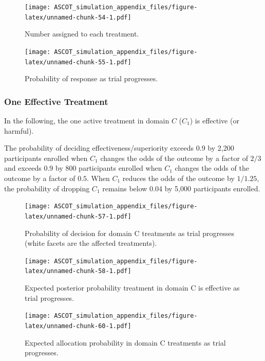 \documentclass[
]{article}
\begin{document}
\begin{figure}
\centering
\texttt{[image: ASCOT\_simulation\_appendix\_files/figure-latex/unnamed-chunk-54-1.pdf]}
\caption{\label{fig:unnamed-chunk-54}Number assigned to each treatment.}
\end{figure}

\begin{figure}
\centering
\texttt{[image: ASCOT\_simulation\_appendix\_files/figure-latex/unnamed-chunk-55-1.pdf]}
\caption{\label{fig:unnamed-chunk-55}Probability of response as trial progresses.}
\end{figure}

\clearpage

\hypertarget{one-effective-treatment}{%
\subsubsection{One Effective Treatment}\label{one-effective-treatment}}

In the following, the one active treatment in domain \(C\) (\(C_1\)) is effective (or harmful).

The probability of deciding effectiveness/superiority exceeds 0.9 by 2,200 participants enrolled when \(C_1\) changes the odds of the outcome by a factor of \(2/3\) and exceeds 0.9 by 800 participants enrolled when \(C_1\) changes the odds of the outcome by a factor of \(0.5\).
When \(C_1\) reduces the odds of the outcome by \(1/1.25\), the probability of dropping \(C_1\) remains below 0.04 by 5,000 participants enrolled.

\begin{figure}
\centering
\texttt{[image: ASCOT\_simulation\_appendix\_files/figure-latex/unnamed-chunk-57-1.pdf]}
\caption{\label{fig:unnamed-chunk-57}Probability of decision for domain C treatments as trial progresses (white facets are the affected treatments).}
\end{figure}

\begin{figure}
\centering
\texttt{[image: ASCOT\_simulation\_appendix\_files/figure-latex/unnamed-chunk-58-1.pdf]}
\caption{\label{fig:unnamed-chunk-58}Expected posterior probability treatment in domain C is effective as trial progresses.}
\end{figure}

\begin{figure}
\centering
\texttt{[image: ASCOT\_simulation\_appendix\_files/figure-latex/unnamed-chunk-60-1.pdf]}
\caption{\label{fig:unnamed-chunk-60}Expected allocation probability in domain C treatments as trial progresses.}
\end{figure}
\end{document}
